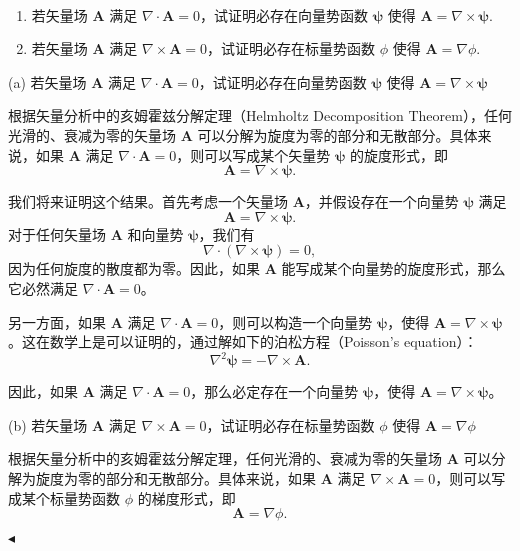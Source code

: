 \documentclass[11pt]{article}
\newenvironment{question}[2][Question]{\begin{trivlist}
\item[\hskip \labelsep {\bfseries #1}\hskip \labelsep {\bfseries #2.}]}{\hfill$\blacktriangleleft$\end{trivlist}}
\begin{document}
    \begin{question}{2 (18') (亥姆霍兹分解)}~\\

    \begin{enumerate}
        \item [a (9')] 若矢量场 $\textbf{A}$ 满足 $\nabla\cdot\textbf{A}=0$，试证明必存在向量势函数 $\bm{\psi}$ 使得 $\textbf{A} = \nabla\times\bm{\psi}.$
        \item [b (9')] 若矢量场 $\textbf{A}$ 满足 $\nabla\times\textbf{A}=0$，试证明必存在标量势函数 $\phi$ 使得 $\textbf{A} = \nabla\phi.$
    \end{enumerate}

 (a) 若矢量场 \(\textbf{A}\) 满足 \(\nabla\cdot\textbf{A}=0\)，试证明必存在向量势函数 \(\bm{\psi}\) 使得 \(\textbf{A} = \nabla\times\bm{\psi}\)

根据矢量分析中的亥姆霍兹分解定理（Helmholtz Decomposition Theorem），任何光滑的、衰减为零的矢量场 \(\textbf{A}\) 可以分解为旋度为零的部分和无散部分。具体来说，如果 \(\textbf{A}\) 满足 \(\nabla \cdot \textbf{A} = 0\)，则可以写成某个矢量势 \(\bm{\psi}\) 的旋度形式，即
\[
\textbf{A} = \nabla \times \bm{\psi}.
\]

我们将来证明这个结果。首先考虑一个矢量场 \(\textbf{A}\)，并假设存在一个向量势 \(\bm{\psi}\) 满足
\[
\textbf{A} = \nabla \times \bm{\psi}.
\]
对于任何矢量场 \(\textbf{A}\) 和向量势 \(\bm{\psi}\)，我们有
\[
\nabla \cdot (\nabla \times \bm{\psi}) = 0,
\]
因为任何旋度的散度都为零。因此，如果 \(\textbf{A}\) 能写成某个向量势的旋度形式，那么它必然满足 \(\nabla \cdot \textbf{A} = 0\)。

另一方面，如果 \(\textbf{A}\) 满足 \(\nabla \cdot \textbf{A} = 0\)，则可以构造一个向量势 \(\bm{\psi}\)，使得 \(\textbf{A} = \nabla \times \bm{\psi}\)。这在数学上是可以证明的，通过解如下的泊松方程（Poisson's equation）：
\[
\nabla^2 \bm{\psi} = -\nabla \times \textbf{A}.
\]

因此，如果 \(\textbf{A}\) 满足 \(\nabla \cdot \textbf{A} = 0\)，那么必定存在一个向量势 \(\bm{\psi}\)，使得 \(\textbf{A} = \nabla \times \bm{\psi}\)。

 (b) 若矢量场 \(\textbf{A}\) 满足 \(\nabla\times\textbf{A}=0\)，试证明必存在标量势函数 \(\phi\) 使得 \(\textbf{A} = \nabla\phi\)

根据矢量分析中的亥姆霍兹分解定理，任何光滑的、衰减为零的矢量场 \(\textbf{A}\) 可以分解为旋度为零的部分和无散部分。具体来说，如果 \(\textbf{A}\) 满足 \(\nabla \times \textbf{A} = 0\)，则可以写成某个标量势函数 \(\phi\) 的梯度形式，即
\[
\textbf{A} = \nabla \phi.
\]


\end{question}
\end{document}
